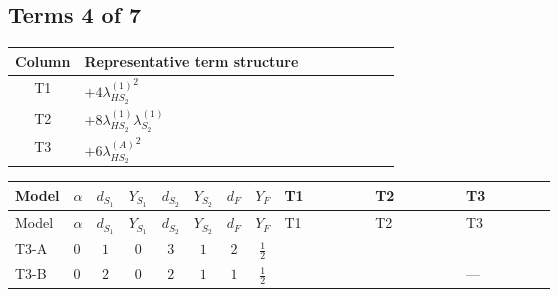 \documentclass[8pt]{article}
\begin{document}
\begin{landscape}
\subsection*{Terms 4 of 7}
\begin{center}
\begin{tabular}{@{}c >{\raggedright\arraybackslash}p{0.82\linewidth}@{}}
\toprule
Column & Representative term structure \\
\midrule
T1 & \(\displaystyle +4 {\lambda_{HS_2}^{(1)}}^2\) \\
\midrule
T2 & \(\displaystyle +8 {\lambda_{HS_2}^{(1)}} {\lambda_{S_2}^{(1)}}\) \\
\midrule
T3 & \(\displaystyle +6 {\lambda_{HS_2}^{(A)}}^2\) \\
\midrule
\bottomrule
\end{tabular}
\end{center}
\smallskip
\tiny
\begin{longtable}{@{}llcccccc >{\raggedright\arraybackslash}p{0.21\linewidth} >{\raggedright\arraybackslash}p{0.21\linewidth} >{\raggedright\arraybackslash}p{0.21\linewidth}@{}}
\toprule
Model & $\alpha$ & $d_{S_1}$ & $Y_{S_1}$ & $d_{S_2}$ & $Y_{S_2}$ & $d_F$ & $Y_F$ & T1 & T2 & T3 \\
\midrule
\endfirsthead
\toprule
Model & $\alpha$ & $d_{S_1}$ & $Y_{S_1}$ & $d_{S_2}$ & $Y_{S_2}$ & $d_F$ & $Y_F$ & T1 & T2 & T3 \\
\midrule
\endhead
T3-A & $0$ & $1$ & $0$ & $3$ & $1$ & $2$ & $\frac{1}{2}$ & \scriptsize\adjustbox{max width=\linewidth}{$\begin{gathered} +4 {\lambda_{HS_2}^{(1)}}^2\end{gathered}$} & \scriptsize\adjustbox{max width=\linewidth}{$\begin{gathered} +8 {\lambda_{HS_2}^{(1)}} {\lambda_{S_2}^{(1)}}\end{gathered}$} & \scriptsize\adjustbox{max width=\linewidth}{$\begin{gathered} +6 {\lambda_{HS_2}^{(A)}}^2\end{gathered}$} \\
\midrule
T3-B & $0$ & $2$ & $0$ & $2$ & $1$ & $1$ & $\frac{1}{2}$ & \scriptsize\adjustbox{max width=\linewidth}{$\begin{gathered} +4 {\lambda_{HS_2}^{(1)}}^2\end{gathered}$} & \scriptsize\adjustbox{max width=\linewidth}{$\begin{gathered} +6 {\lambda_{HS_2}^{(1)}} {\lambda_{S_2}^{(1)}}\end{gathered}$} & --- \\

\end{longtable}
\end{landscape}
\end{document}
